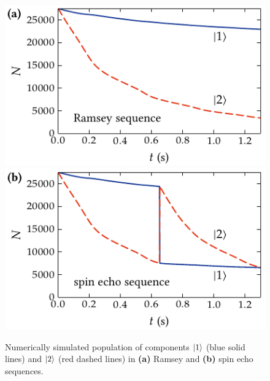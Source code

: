 \begin{figure}
    \centerline{%
    \includegraphics{figures_generated/bec_noise/ramsey_single_run_pop.pdf}%
    \includegraphics{figures_generated/bec_noise/echo_single_run_pop.pdf}}

    \caption[Component population in Ramsey and spin echo sequences]{
    Numerically simulated population of components $\mbox{\ensuremath{\left\vert 1 \right\rangle}}$ (blue solid lines) and $\mbox{\ensuremath{\left\vert 2 \right\rangle}}$ (red dashed lines) in \textbf{(a)} Ramsey and \textbf{(b)} spin echo sequences.}%

    \label{fig:bec-noise:visibility:population}
\end{figure}

